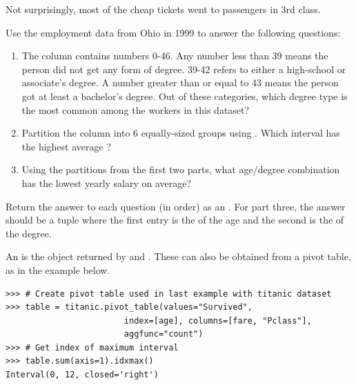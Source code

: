 Not surprisingly, most of the cheap tickets went to passengers in 3rd class.
%

\begin{problem}
Use the employment data from Ohio in 1999 to answer the following questions:

\begin{enumerate}
\item The column  contains numbers 0-46.
Any number less than 39 means the person did not get any form of degree.
39-42 refers to either a high-school or associate's degree.
A number greater than or equal to 43 means the person got at least a bachelor's degree.
Out of these categories, which degree type is the most common among the workers in this dataset?

\item Partition the  column into 6 equally-sized groups using .
Which interval has the highest average ?

\item Using the partitions from the first two parts, what age/degree combination has the lowest yearly salary on average?
\end{enumerate}

Return the answer to each question (in order) as an .
For part three, the answer should be a tuple where the first entry is the  of the age and the second is the  of the degree.

An  is the object returned by  and .
These can also be obtained from a pivot table, as in the example below.

\begin{lstlisting}
>>> # Create pivot table used in last example with titanic dataset
>>> table = titanic.pivot_table(values="Survived",
                        index=[age], columns=[fare, "Pclass"],
                        aggfunc="count")
>>> # Get index of maximum interval
>>> table.sum(axis=1).idxmax()
Interval(0, 12, closed='right')

\end{lstlisting}
\end{problem}

